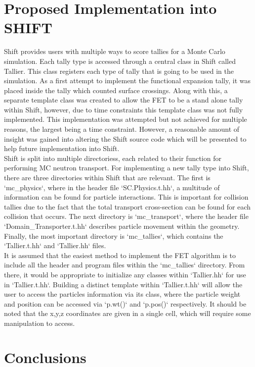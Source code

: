 \documentclass[10tma4paper]{article}
\begin{document}
\section{Proposed Implementation into SHIFT}\label{shift}
Shift provides users with multiple ways to score tallies for a Monte Carlo simulation. Each tally type is accessed through a central class in Shift called Tallier. This class registers each type of tally that is going to be used in the simulation. As a first attempt to implement the functional expansion tally, it was placed inside the tally which counted surface crossings. Along with this, a separate template class was created to allow the FET to be a stand alone tally within Shift, however, due to time constraints this template class was not fully implemented. This implementation was attempted but not achieved for multiple reasons, the largest being a time constraint. However, a reasonable amount of insight was gained into altering the Shift source code which will be presented to help future implementation into Shift. 
\\
Shift is split into multiple directoriess, each related to their function for performing MC neutron transport. For implementing a new tally type into Shift, there are three directories within Shift that are relevant. The first is `mc\_physics`, where in the header file `SC.Physics.t.hh`, a multitude of information can be found for particle interactions. This is important for collision tallies due to the fact that the total transport cross-section can be found for each collision that occurs. The next directory is `mc\_transport`, where the header file `Domain\_Transporter.t.hh` describes particle movement within the geometry. Finally, the most important directory is `mc\_tallies`, which contains the `Tallier.t.hh` and `Tallier.hh` files. 
\\
It is assumed that the easiest method to implement the FET algorithm is to include all the header and program files within the `mc\_tallies` directory. From there, it would be appropriate to initialize any classes within `Tallier.hh` for use in `Tallier.t.hh`. Building a distinct template within `Tallier.t.hh` will allow the user to access the particles information via its class, where the particle weight and position can be accessed via `p.wt()` and `p.pos()` respectively. It should be noted that the x,y,z coordinates are given in a single cell, which will require some manipulation to access.
\section{Conclusions}\label{conclusion}
\end{document}
